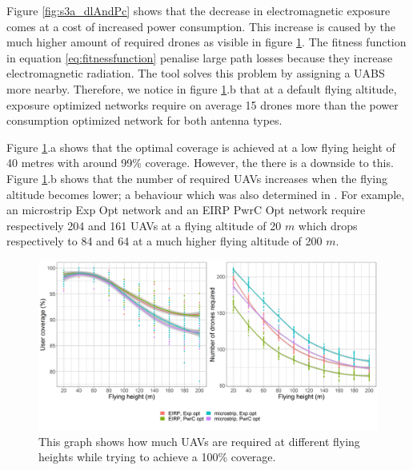 Figure \ref{fig:s3a_dlAndPc} shows that the decrease in electromagnetic exposure comes at a cost of increased power consumption.
This increase is caused by the much higher amount of required drones as visible in figure \ref{fig:s3a_numDronesAndCov}.
The fitness function in equation \ref{eq:fitnessfunction} penalise large path losses because they increase electromagnetic radiation.
The tool solves this problem by assigning a \gls{UABS} more nearby. Therefore, we notice in 
figure \ref{fig:s3a_numDronesAndCov}.b that at a default flying altitude, exposure optimized networks require on average 15 drones more 
than the power consumption optimized network for both antenna types.

Figure \ref{fig:s3a_numDronesAndCov}.a shows that the optimal coverage is achieved at a low flying height of 
40 metres with around 99\% coverage. 
However, the there is a downside to this. 
Figure \ref{fig:s3a_numDronesAndCov}.b 
 shows that the number of required \gls{UAV}s increases when the flying altitude becomes lower;
a behaviour which was also determined in \cite{J2}.
For example, an microstrip \gls{Exp Opt} network and an \gls{EIRP} \gls{PwrC Opt} network require respectively 204 and 161 \gls{UAV}s
at a flying altitude of 20 $m$ which drops respectively to 84 and 64 at a much higher flying altitude of 200 $m$.

\begin{figure}[]
  \includegraphics[width=\textwidth]{../results/s3/fhvsnumdronesAndCov.png}
  \caption{This graph shows how much \acs{UAV}s are required at different flying heights while trying to achieve a 100\% coverage.}
  \label{fig:s3a_numDronesAndCov}
\end{figure}

